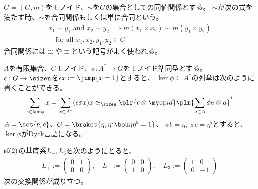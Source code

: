 {	\begin{note}[合同関係]\label{note:合同関係} %
		$G=(G,m)$をモノイド、$\sim$を$G$の集合としての同値関係とする。
		$\sim$が次の式を満たす時、$\sim$を合同関係もしくは単に合同という。
		\begin{equation*}\begin{split}
			x_1\sim y_1 \text{ and } x_2\sim y_2 \implies 
			m(x_1\times x_2) \sim m(y_1\times y_2) \\
			\quad\text{for all } x_1,x_2,y_1,y_2\in G
		\end{split}\end{equation*}
		合同関係には$\cong$や$\equiv$という記号がよく使われる。
	\end{note} %

	\begin{note}[準同型の観察]\label{note:準同型の観察} %
		$A$を有限集合、$G$モノイド、$\phi:A^*\to G$をモノイド準同型とする。
		$\epsilon:G\to\sizen$を$\epsilon x:=\jump{x=1}$とすると、
		$\ker\phi\subseteq A^*$の列挙は次のように書くことができる。
		\begin{equation*}\begin{split}
			\sum_{x\in\ker\phi} x = \sum_{x\in A^*} (\epsilon\phi x) x
			\simeq_\sizen \plr{\epsilon\otimes\id}
			\plr{\sum_{a\in A}\phi a\otimes a}^*
		\end{split}\end{equation*}
		$A=\set{b,c}$、$G=\braket{\eta,\eta^\flat\bou\eta\eta^\flat=1}$、
		$\phi b=\eta,\;\phi c=\eta^\flat$とすると、$\ker\phi$がDyck言語になる。
	\end{note} %
	\begin{note}[量子群の観察]\label{note:量子群の観察} %
		${\mathfrak{sl}}(2)$の基底系$L_\pm,L_3$を次のようにとると、
		\begin{equation*}\begin{split}
			L_+ := \begin{pmatrix}
				0 & 1 \\ 0 & 0
			\end{pmatrix},\quad L_- := \begin{pmatrix}
				0 & 0 \\ 1 & 0
			\end{pmatrix},\quad L_3 := \begin{pmatrix}
				1 & 0 \\ 0 & -1
			\end{pmatrix}
		\end{split}\end{equation*}
		次の交換関係が成り立つ。

\end{note}}
